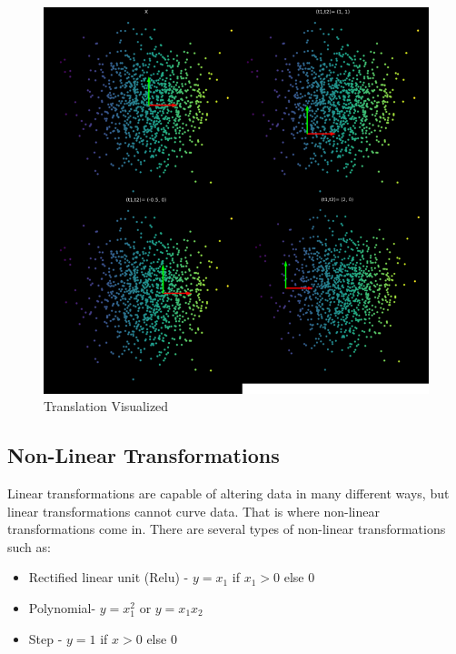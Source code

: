 \begin{figure}[h!]
\begin{center}
\includegraphics{students/SP19_DL_Lab_1_Notes/images/translation.png}
\end{center} 
\caption{Translation Visualized}
\label{fig:mon}
\end{figure}
\FloatBarrier

\subsection{Non-Linear Transformations}
Linear transformations are capable of altering data in many different ways, but linear transformations cannot curve data. 
That is where non-linear transformations come in. There are several types of non-linear transformations such as:

\begin{itemize}
\tightlist
\item
Rectified linear unit (Relu) - \(y= x_1\) if \(x_1 > 0\) else  0 
\item
Polynomial- \(y = x_1^2\) or \(y = x_1 x_2\)

\item
Step - \(y = 1 \) if \(x > 0 \) else 0 

\end{itemize}

